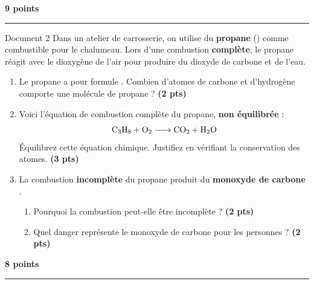 \documentclass[12pt,a4paper]{article}
\newenvironment{questions}{}{}
\newcommand{\pts}[1]{\hfill\textcolor{bleuDNB}{\textbf{(#1 pts)}}}
\begin{document}
\vspace{5mm}

\hfill{\normalsize\textcolor{bleuDNB}{\textbf{9 points}}}\\[-1mm]
{\color{bleuDNB}\rule{\linewidth}{1.2pt}}
\vspace{3mm}

\begin{docbox}{Document 2}
Dans un atelier de carrosserie, on utilise du \textbf{propane} () comme combustible
pour le chalumeau. Lors d'une combustion \textbf{compl\`ete}, le propane r\'eagit avec le
dioxyg\`ene de l'air pour produire du dioxyde de carbone et de l'eau.
\end{docbox}



\vspace{2mm}

\begin{questions}
\begin{enumerate}[label=\textbf{\arabic*.}, leftmargin=*, itemsep=4mm]

\item Le propane a pour formule .
Combien d'atomes de carbone et d'hydrog\`ene comporte une mol\'ecule de propane ? \pts{2}

\item Voici l'\'equation de combustion compl\`ete du propane, \textbf{non \'equilibr\'ee} :
\[
\ce{C3H8 + O2 -> CO2 + H2O}
\]
\'Equilibrez cette \'equation chimique. Justifiez en v\'erifiant la conservation des atomes. \pts{3}

\item La combustion \textbf{incompl\`ete} du propane produit du \textbf{monoxyde de carbone} .
\begin{enumerate}[label=\alph*), itemsep=2mm]
  \item Pourquoi la combustion peut-elle \^etre incompl\`ete ? \pts{2}
  \item Quel danger repr\'esente le monoxyde de carbone  pour les personnes ? \pts{2}
\end{enumerate}


\end{enumerate}
\end{questions}

\vspace{5mm}

\newpage
\hfill{\normalsize\textcolor{bleuDNB}{\textbf{8 points}}}\\[-1mm]
{\color{bleuDNB}\rule{\linewidth}{1.2pt}}
\vspace{3mm}
\end{document}
